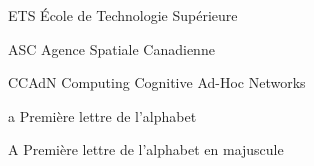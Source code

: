 \documentclass[letterpaper%
, oneside%
, 12pt%
,thesepararticles%
, english%
,creativecommons,hyperref, withAlgo2e%
]{thETS}
\begin{document}
\tableofcontents


\listoftables


\listoffigures

\listofalgorithms


\begin{listofabbr}[3cm]
\item [ETS] École de Technologie Supérieure
\item [ASC] Agence Spatiale Canadienne
\item [CCAdN] Computing Cognitive Ad-Hoc Networks 
\end{listofabbr}


\begin{listofsymbols}[3cm]
\item [a] Première lettre de l'alphabet
\item [A] Première lettre de l'alphabet en majuscule
\end{listofsymbols}


\cleardoublepage


\reversemarginpar

\end{document}
